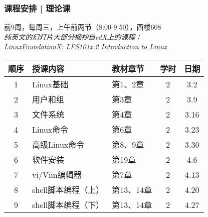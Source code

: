\begin{frame}
  \frametitle{课程安排 | 理论课}
  \begin{center}
  \alert{前9周，每周三，上午前两节（8:00-9:50），西楼608}\\
  \vspace{0.2cm}
  {\footnotesize
  \textit{纯英文的幻灯片大部分摘抄自edX上的课程：\\ \href{https://www.edx.org/course/introduction-linux-linuxfoundationx-lfs101x-2}{LinuxFoundationX: LFS101x.2 Introduction to Linux}}
  }
  \end{center}
  \vspace{-0.5cm}
  \begin{table}
    \centering
    \begin{tabular}{cllcc}
      \hline
      \rowcolor{blue!50}顺序 & 授课内容 & 教材章节 & 学时 & 日期\\
      \hline
      1 & Linux基础 & 第1、2章 & 2 & 3.2\\
      2 & 用户和组 & 第3章 & 2 & 3.9\\
      3 & 文件系统 & 第4章 & 2 & 3.16\\
      4 & Linux命令 & 第6章 & 2 & 3.23\\
      5 & 高级Linux命令 & 第8、9章 & 2 & 3.30\\
      6 & 软件安装 & 第19章 & 2 & 4.6\\
      7 & vi/Vim编辑器 & 第7章 & 2 & 4.13\\
      8 & shell脚本编程（上） & 第13、14章 & 2 & 4.20\\
      9 & shell脚本编程（下） & 第13、14章 & 2 & 4.27\\
      \hline
    \end{tabular}
  \end{table}
\end{frame}

